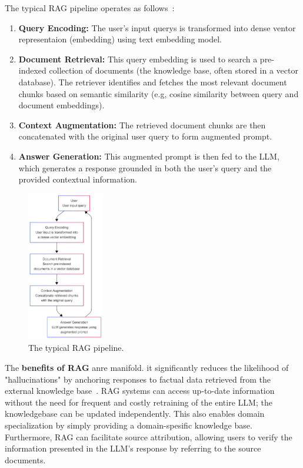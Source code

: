 \documentclass[12pt]{report}
\begin{document}
The typical RAG pipeline operates as follows~\cite{nvidiaRAG, weka2024rag}:

\begin{enumerate}
    \item \textbf{Query Encoding:} The user's input querys is transformed into dense ventor representaion (embedding) using text embedding model.
    \item \textbf{Document Retrieval:} This query embedding is used to search a pre-indexed collection of documents (the knowledge base, often stored in a vector database). The retriever identifies and fetches the most relevant document chunks based on semantic similarity (e.g, cosine similarity between query and document embeddings).
    \item \textbf{Context Augmentation:} The retrieved document chunks are then concatenated with the original user query to form augmented prompt.
    \item \textbf{Answer Generation:} This augmented prompt is then fed to the LLM, which generates a response grounded in both the user's query and the provided contextual information.
\end{enumerate}

\begin{figure}[!htbp]
    \centering
    \includegraphics[width=0.3\textwidth]{images/1/rag-pipeline.png}
    \caption{The typical RAG pipeline.}
    \label{fig:rag-pipeline}
\end{figure}

The \textbf{benefits of RAG} anre manifold. it significantly reduces the likelihood of "hallucinations" by anchoring responses to factual data retrieved from the external knowledge base~\cite{xu2025simragselfimprovingretrievalaugmentedgeneration}.
RAG systems can access up-to-date information without the need for frequent and costly retraining of the entire LLM; the knowledgebase can be updated independently. This also enables domain specialization by simply providing a domain-spesific knowledge base. Furthermore, RAG can facilitate source attribution, allowing users to verify the information presented in the LLM's response by referring to the source documents.
\end{document}
